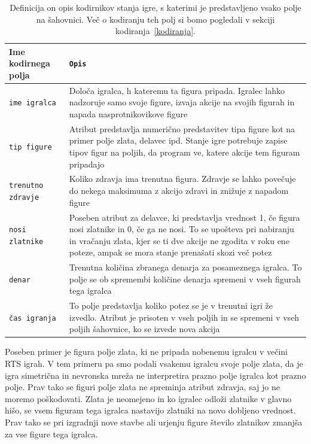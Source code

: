 \documentclass[a4paper, 12pt]{book}
\begin{document}
\begin{table}
	\begin{center}
		\begin{tabular}{p{0.2\linewidth}|p{0.8\linewidth}}
			Ime kodirnega polja    & {\tt Opis} \\ \hline
			{\tt ime igralca}      & Določa igralca, h kateremu ta figura pripada. 
									 Igralec lahko nadzoruje samo svoje figure, izvaja akcije na svojih figurah in napada nasprotnikovikove figure \\
			{\tt tip figure}       & Atribut predstavlja numerično predstavitev tipa figure kot na primer polje zlata, delavec ipd.
									 Stanje igre potrebuje zapise tipov figur na poljih, da program ve, katere akcije tem figuram pripadajo\\
			{\tt trenutno zdravje} & Koliko zdravja ima trenutna figura. 
									 Zdravje se lahko povečuje do nekega maksimuma z akcijo zdravi in znižuje z napadom figure \\
			{\tt nosi zlatnike}    & Poseben atribut za delavce, ki predstavlja vrednost 1, če figura nosi zlatnike in 0, če ga ne nosi. 
									 To se upošteva pri nabiranju in vračanju zlata, kjer se ti dve akcije ne zgodita v roku ene poteze, ampak se mora stanje prenašati skozi več potez \\
			{\tt denar}            & Trenutna količina zbranega denarja za posameznega igralca. 
									 To polje se ob spremembi količine denarja spremeni v vseh figurah tega igralca \\
			{\tt čas igranja}      & To polje predstavlja koliko potez se je v trenutni igri že izvedlo. 
									 Atribut je prisoten v vseh poljih in se spremeni v vseh poljih šahovnice, ko se izvede nova akcija \\
		\end{tabular}
	\end{center}
	\caption{Definicija on opis kodirnikov stanja igre, s katerimi je predstavljeno vsako polje na šahovnici. Več o kodiranju teh polj si bomo pogledali v sekciji kodiranja~\ref{kodiranja}.}
	\label{tableEncoders}
\end{table}

Poseben primer je figura polje zlata, ki ne pripada nobenemu igralcu v večini RTS igrah. 
V tem primeru pa smo podali vsakemu igralcu svoje polje zlata, da je igra simetrična in nevronska mreža ne interpretira prazno polje igralca kot prazno polje.
Prav tako se figuri polje zlata ne spreminja atribut zdravja, saj jo ne moremo poškodovati. 
Zlata je neomejeno in ko igralec odloži zlatnike v glavno hišo, se vsem figuram tega igralca nastavijo zlatniki na novo dobljeno vrednost. 
Prav tako se pri izgradnji nove stavbe ali urjenju figure število zlatnikov zmanjša za vse figure tega igralca.
\end{document}
